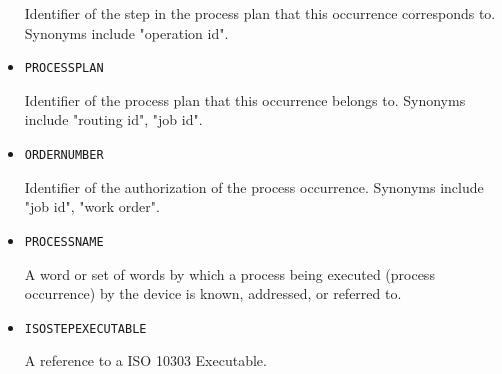 \begin{itemize}
Identifier of the step in the process plan that this occurrence corresponds to. Synonyms include "operation id".


\item \texttt{PROCESS\textunderscore PLAN}  

Identifier of the process plan that this occurrence belongs to. Synonyms include "routing id", "job id".


\item \texttt{ORDER\textunderscore NUMBER}  

Identifier of the authorization of the process occurrence. Synonyms include "job id", "work order".


\item \texttt{PROCESS\textunderscore NAME}  

A word or set of words by which a process being executed (process occurrence) by the device is known, addressed, or referred to.



\item \texttt{ISO\textunderscore STEP\textunderscore EXECUTABLE}  

A reference to a ISO 10303 Executable.

\end{itemize}

